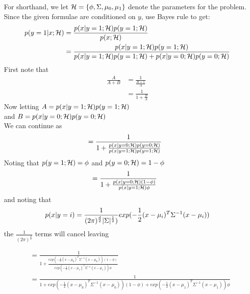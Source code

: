 \begin{answer}
  For shorthand, we let $\mathcal{H} = \{\phi, \Sigma, \mu_{0}, \mu_1\}$ denote
  the parameters for the problem.
  Since the given formulae are conditioned on $y$, use Bayes rule to get:
  \begin{align*}
    p(y =1\vert  x ; \mathcal{H}) &= \frac {p(x\vert y=1; \mathcal{H}) p(y=1; \mathcal{H})} {p(x; \mathcal{H})}\\
    & = \frac {p(x\vert y=1; \mathcal{H}) p(y=1; \mathcal{H})}
      {p(x\vert y=1; \mathcal{H}) p(y=1; \mathcal{H}) + p(x\vert y={0}; \mathcal{H}) p(y={0};
      \mathcal{H})}\\
   \end{align*}
   First note that
   \begin{align*}
   \frac{A}{A+B} &= \frac{1}{\frac{B+1}{A}}\\
   &= \frac{1}{1+\frac{B}{A}}
   \end{align*}
   Now letting $A=p(x\vert y=1; \mathcal{H}) p(y=1; \mathcal{H})$\\
   and $B=p(x\vert y=0; \mathcal{H}) p(y=0; \mathcal{H})$\\
   We can continue as
   \begin{align*}
        & = \frac {1}
        {1 + \frac{p(x\vert y=0; \mathcal{H}) p(y={0}; \mathcal{H})}
                  {p(x\vert y=1;   \mathcal{H}) p(y={1}; \mathcal{H})}}
    \end{align*}
    Noting that $p(y={1}; \mathcal{H})=\phi $ and  $p(y={0}; \mathcal{H}) = 1-\phi$
       \begin{align*}
        & = \frac {1}
        {1 + \frac{p(x\vert y=0; \mathcal{H}) (1-\phi)}
                  {p(x\vert y=1;   \mathcal{H}) \phi }}
    \end{align*}
    and noting that 
    \begin{align*}    
     p(x\vert y=i) &= \frac{1}{(2 \pi)^{\frac{d}{2}} \lvert\Sigma\rvert^{\frac{1}{2}})} exp(-\frac{1}{2} (x- \mu_i)^{T} \Sigma^{-1} (x-\mu_i)) \\
     \end{align*}
     the $\frac{1}{(2 \pi)^{\frac{d}{2}}} $ terms will cancel leaving
     
   \begin{align*}
        & = \frac {1}
        {1 + \frac{exp(-\frac{1}{2} (x- \mu_0)^{T} \Sigma^{-1} (x-\mu_0))  (1-\phi)}
                  {exp(-\frac{1}{2} (x- \mu_1)^{T} \Sigma^{-1} (x-\mu_1))  \phi }}\\
  & = \frac {1}
   {1 + exp(-\frac{1}{2} (x- \mu_0)^{T} \Sigma^{-1} (x-\mu_0))  (1-\phi) + exp(-\frac{1}{2} (x- \mu_1)^{T} \Sigma^{-1} (x-\mu_1))  \phi }
    \end{align*}
     

\end{answer}
\clearpage

